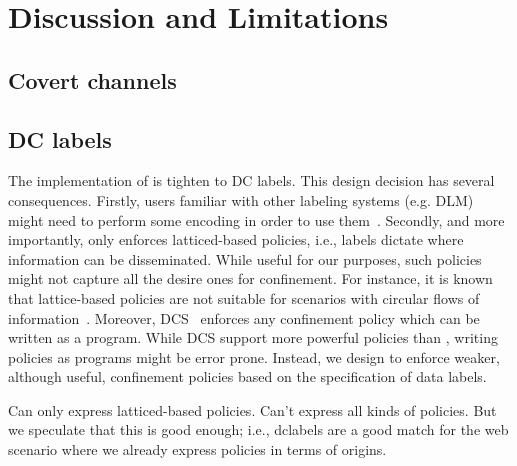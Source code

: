 \section{Discussion and Limitations}
\label{sec:discussion}


\subsection{Covert channels}

\subsection{DC labels}

The implementation of \sys{} is tighten to DC labels. This design decision has
several consequences. Firstly, users familiar with other labeling systems
(e.g. DLM) might need to perform some encoding in order to use
them~\cite{GenLabels}.  Secondly, and more importantly, \sys{} only enforces
latticed-based policies, i.e., labels dictate where information can be
disseminated.  While useful for our purposes, such policies might not capture
all the desire ones for confinement. For instance, it is known that
lattice-based policies are not suitable for scenarios with circular flows of
information~\cite{Badger:1995}. Moreover, DCS~\cite{Akhawe2013} enforces any
confinement policy which can be written as a program. While DCS support more
powerful policies than \sys{}, writing policies as programs might be error
prone. Instead, we design \sys{} to enforce weaker, although useful,
confinement policies based on the specification of data labels. 







Can only express latticed-based policies. Can't express all kinds of
policies. But we speculate that this is good enough; i.e., dclabels
are a good match for the web scenario where we already express
policies in terms of origins.




